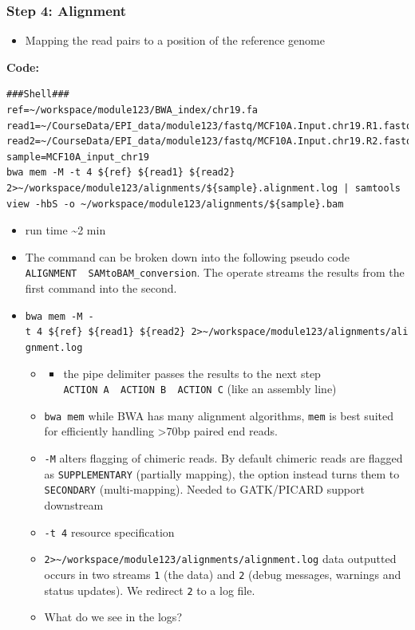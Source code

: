 \documentclass[
]{book}
\providecommand{\tightlist}{%
  \setlength{\itemsep}{0pt}\setlength{\parskip}{0pt}}
\begin{document}
\subsubsection{Step 4: Alignment}\label{step-4-alignment}

\begin{itemize}
\tightlist
\item
  Mapping the read pairs to a position of the reference genome
\end{itemize}

\textbf{Code:}

\begin{verbatim}
###Shell###
ref=~/workspace/module123/BWA_index/chr19.fa
read1=~/CourseData/EPI_data/module123/fastq/MCF10A.Input.chr19.R1.fastq.gz
read2=~/CourseData/EPI_data/module123/fastq/MCF10A.Input.chr19.R2.fastq.gz
sample=MCF10A_input_chr19
bwa mem -M -t 4 ${ref} ${read1} ${read2} 2>~/workspace/module123/alignments/${sample}.alignment.log | samtools view -hbS -o ~/workspace/module123/alignments/${sample}.bam
\end{verbatim}

\begin{itemize}
\item
  run time \textasciitilde2 min
\item
  The command can be broken down into the following pseudo code \texttt{ALIGNMENT\ \textbar{}\ SAMtoBAM\_conversion}. The \texttt{\textbar{}} operate streams the results from the first command into the second.
\item
  \texttt{bwa\ mem\ -M\ -t\ 4\ \$\{ref\}\ \$\{read1\}\ \$\{read2\}\ 2\textgreater{}\textasciitilde{}/workspace/module123/alignments/alignment.log}

  \begin{itemize}
  \tightlist
  \item
    \begin{itemize}
    \tightlist
    \item
      \texttt{\textbar{}} the pipe delimiter passes the results to the next step \texttt{ACTION\ A\ \textbar{}\ ACTION\ B\ \textbar{}\ ACTION\ C} (like an assembly line)
    \end{itemize}
  \item
    \texttt{bwa\ mem} while BWA has many alignment algorithms, \texttt{mem} is best suited for efficiently handling \textgreater70bp paired end reads.
  \item
    \texttt{-M} alters flagging of chimeric reads. By default chimeric reads are flagged as \texttt{SUPPLEMENTARY} (partially mapping), the option instead turns them to \texttt{SECONDARY} (multi-mapping). Needed to GATK/PICARD support downstream
  \item
    \texttt{-t\ 4} resource specification
  \item
    \texttt{2\textgreater{}\textasciitilde{}/workspace/module123/alignments/alignment.log} data outputted occurs in two streams \texttt{1} (the data) and \texttt{2} (debug messages, warnings and status updates). We redirect \texttt{2} to a log file.
  \item
    What do we see in the logs?
  \end{itemize}
\end{itemize}
\end{document}
